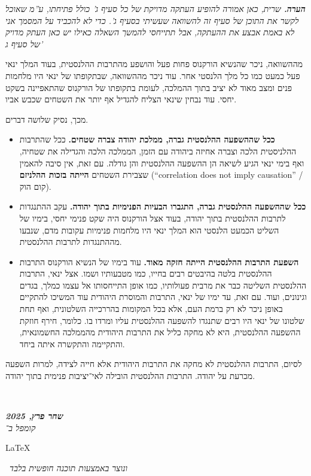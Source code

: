 \documentclass[]{article}
\newcommand\en[1] {\begin{otherlanguage}{english}#1\end{otherlanguage}}
\newcommand\ndoc  {\dotfill \\ \vfil {\begin{center}
            {\textbf{\textit{שחר פרץ, 2025}} \\
                \scriptsize \textit{קומפל ב־}\en{\LaTeX}\,\textit{ ונוצר באמצעות תוכנה חופשית בלבד}}
    \end{center}} \vfil	}
\newcommand\cb[1]   {\color{codeblue}#1\color{black}}
\begin{document}
\begin{enumerate}[A.]
        \textit{\textbf{הערה. }שרית, כאן אמורה להופיע העתקה מדויקת של כל סעיף ג' כולל פתיחתו, ע''מ שאוכל לקשר את התוכן של סעיף זה להשוואה שעשיתי בסעיף ג'. כדי לא להכביד על המסמך אני לא באמת אבצע את ההעתקה, אבל תתייחסי להמשך השאלה כאילו יש כאן העתק מדויק של סעיף ג'}
        
        מההשוואה, ניכר שהנשיא הורקנוס פחות פעל והושפע מהתרבות ההלנסטית, בעוד המלך ינאי פעל כמעט כמו כל מלך הלנסטי אחר. עוד ניכר מההשוואה, שבתקופתו של ינאי היו מלחמות פנים ומצב מאוד לא יציב בתוך ההמלכה, לעומת בתקופתו של הורקנוס שהתאפיינה בשקט יחסי. עוד נבחין שינאי הצליח להגדיל אף יותר את השטחים שכבש אביו. 
        
        מכך, נסיק שלושה דברים. 
        
        \begin{itemize}
            \item \textbf{ככל שההשפעה ההלנסטית גברה, ממלכת יהודה צברה שטחים. }ככל שהתרבות ההלניסטית הלכה וצברה אחיזה ביהודה עם הזמן, הממלכה הלכה והגדילה את שטחיה, ואף בימי ינאי הגיע לשיאה הן ההשפעה ההלנסטית והן גודלה. עם זאת, אין סיבה להאמין שצבירת השטחים \textbf{הייתה בזכות ההלניזם} (``correlation does not imply causation'' / קום הוק). 
            \item \textbf{ככל שההשפעה ההלנסטית גברה, התגברו הבעיות הפנימיות בתוך יהודה. }עקב ההתנגדות לתרבות ההלנסטית בתוך יהודה, בעוד אצל הורקנוס היה שקט פנימי יחסי, בימיו של השליט הכמעט הלנסטי הוא המלך ינאי היו מלחמות פנימיות עקובות מדם, שנבעו מההתנגדות לתרבות ההלנסטית. 
            \item \textbf{השפעת התרבות ההלנסטית הייתה חזקה מאוד. }עוד בימיו של הנשיא הורקנוס התרבות ההלנסטית בלטה בהיבטים רבים בחייו, כמו מטבעותיו ושמו. אצל ינאי, התרבות ההלנסטית השליטה כבר את מרבית פעולותיו, כמו אופן התייחסותו אל עצמו כמלך, בגדים וגינונים, ועוד. עם זאת, עד ימיו של ינאי, התרבות והמוסרת היהודית עוד המשיכו להתקיים באופן ניכר לא רק ברמת העם, אלא בכל המקומות בהררכייה השלטונית, ואף תחת שלטונו של ינאי היו רבים שתנגדו להשפעה ההלנסטית עליו ומרדו בו. כלומר, חירף חוזקת ההשפעה ההלנסטית, היא לא מחקה כליל את התרבות היהודית מהממלכה החשמונאית, והתקיימה והתקשרה איתה ביחד. 
        \end{itemize}
        
        לסיום, התרבות ההלנסטית \cb{לא מחקה את התרבות היהודית אלא חייה לצידה}, למרות השפעה מכרעת על יהודה. התרבות ההלנסטית הובילה לאי־יציבות פנימית בתוך יהודה. 
        
    \end{enumerate}
    
    
    
    \ndoc
\end{document}
